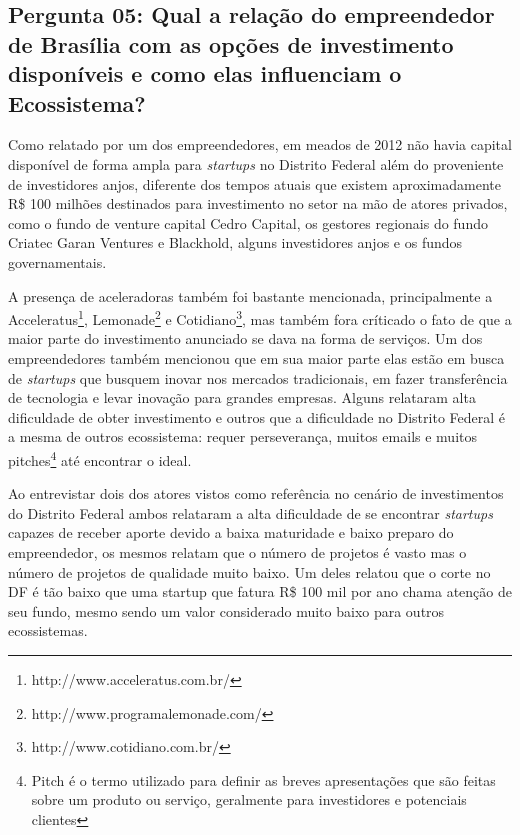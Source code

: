 \subsection*{Pergunta 05: Qual a relação do empreendedor de Brasília com as opções de investimento disponíveis e como elas influenciam o Ecossistema?}
\label{subsection:pergunta_de_pesquisa_5}

Como relatado por um dos empreendedores, em meados de 2012 não havia capital disponível de forma ampla para \textit{startups} no Distrito Federal além do proveniente de investidores anjos, diferente dos tempos atuais que existem aproximadamente R\$ 100 milhões destinados para investimento no setor na mão de atores privados, como o fundo de venture capital Cedro Capital, os gestores regionais do fundo Criatec Garan Ventures e Blackhold, alguns investidores anjos e os fundos governamentais. 

A presença de aceleradoras também foi bastante mencionada, principalmente a Acceleratus\footnote{http://www.acceleratus.com.br/}, Lemonade\footnote{http://www.programalemonade.com/} e Cotidiano\footnote{http://www.cotidiano.com.br/}, mas também fora críticado o fato de que a maior parte do investimento anunciado se dava na forma de serviços. Um dos empreendedores também mencionou que em sua maior parte elas estão em busca de \textit{startups} que busquem inovar nos mercados tradicionais, em fazer transferência de tecnologia e levar inovação para grandes empresas. Alguns relataram alta dificuldade de obter investimento e outros que a dificuldade no Distrito Federal é a mesma de outros ecossistema: requer perseverança, muitos emails e muitos pitches\footnote{Pitch é o termo utilizado para definir as breves apresentações que são feitas sobre um produto ou serviço, geralmente para investidores e potenciais clientes} até encontrar o ideal.

Ao entrevistar dois dos atores vistos como referência no cenário de investimentos do Distrito Federal ambos relataram a alta dificuldade de se encontrar \textit{startups} capazes de receber aporte devido a baixa maturidade e baixo preparo do empreendedor, os mesmos relatam que o número de projetos é vasto mas o número de projetos de qualidade muito baixo. Um deles relatou que o corte no DF é tão baixo que uma startup que fatura R\$ 100 mil por ano chama atenção de seu fundo, mesmo sendo um valor considerado muito baixo para outros ecossistemas. 

